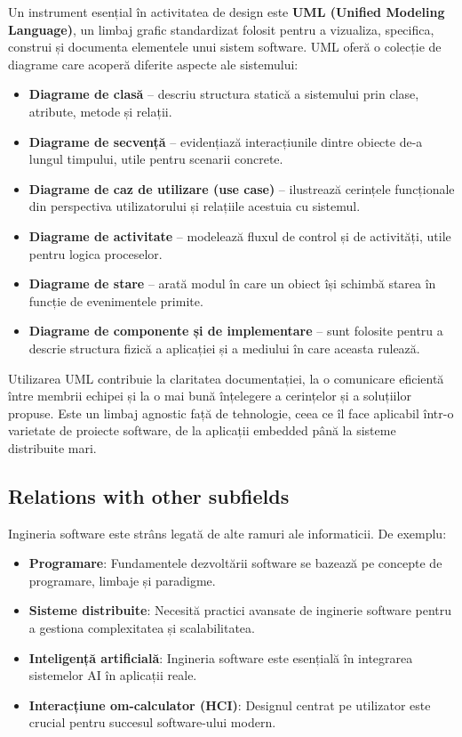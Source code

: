 \documentclass[12pt, letterpaper]{article}
\begin{document}
Un instrument esențial în activitatea de design este \textbf{UML (Unified Modeling Language)}, un limbaj grafic standardizat folosit pentru a vizualiza, specifica, construi și documenta elementele unui sistem software. UML oferă o colecție de diagrame care acoperă diferite aspecte ale sistemului:
\begin{itemize}
  \item \textbf{Diagrame de clasă} – descriu structura statică a sistemului prin clase, atribute, metode și relații.
  \item \textbf{Diagrame de secvență} – evidențiază interacțiunile dintre obiecte de-a lungul timpului, utile pentru scenarii concrete.
  \item \textbf{Diagrame de caz de utilizare (use case)} – ilustrează cerințele funcționale din perspectiva utilizatorului și relațiile acestuia cu sistemul.
  \item \textbf{Diagrame de activitate} – modelează fluxul de control și de activități, utile pentru logica proceselor.
  \item \textbf{Diagrame de stare} – arată modul în care un obiect își schimbă starea în funcție de evenimentele primite.
  \item \textbf{Diagrame de componente și de implementare} – sunt folosite pentru a descrie structura fizică a aplicației și a mediului în care aceasta rulează.
\end{itemize}

Utilizarea UML contribuie la claritatea documentației, la o comunicare eficientă între membrii echipei și la o mai bună înțelegere a cerințelor și a soluțiilor propuse. Este un limbaj agnostic față de tehnologie, ceea ce îl face aplicabil într-o varietate de proiecte software, de la aplicații embedded până la sisteme distribuite mari.


\subsection*{Relations with other subfields}
Ingineria software este strâns legată de alte ramuri ale informaticii. De exemplu:
\begin{itemize}
  \item \textbf{Programare}: Fundamentele dezvoltării software se bazează pe concepte de programare, limbaje și paradigme.
  \item \textbf{Sisteme distribuite}: Necesită practici avansate de inginerie software pentru a gestiona complexitatea și scalabilitatea.
  \item \textbf{Inteligență artificială}: Ingineria software este esențială în integrarea sistemelor AI în aplicații reale.
  \item \textbf{Interacțiune om-calculator (HCI)}: Designul centrat pe utilizator este crucial pentru succesul software-ului modern.
\end{itemize}
\end{document}
